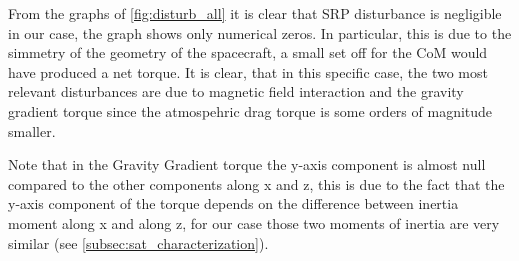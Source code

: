 From the graphs of \autoref{fig:disturb_all} it is clear that SRP disturbance is negligible
in our case, the graph shows only numerical zeros. In particular, this is due to the simmetry of 
the geometry of the spacecraft, a small set off for the CoM would have produced a net torque. 
It is clear, that in this specific case, the two most relevant disturbances are due to magnetic field
interaction and the gravity gradient torque since the atmospehric drag torque is some orders of magnitude 
smaller.

Note that in the Gravity Gradient torque the y-axis component is almost null compared to the other 
components along x and z, this is due to the fact that the y-axis component of the torque depends on 
the difference between inertia moment along x and along z, for our case those two moments of inertia are 
very similar (see \autoref{subsec:sat_characterization}). 